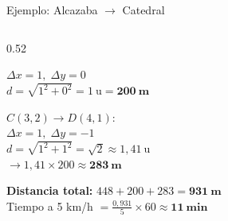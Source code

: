 \documentclass[aspectratio=169, 10pt, spanish]{beamer}
\begin{document}
\begin{frame}{Ejemplo: Alcazaba $\rightarrow$ Catedral}
\begin{columns}[c]
\begin{column}{0.52\textwidth}
\begin{pasobox}[2]
        $\Delta x=1,\;\Delta y=0$\\
        $d=\sqrt{1^2+0^2}=1\ \text{u} = \mathbf{200\ \text{m}}$
      \end{pasobox}
      \vspace{4pt}
      \begin{pasobox}[3]
        \AlmFontFootnote
        $C(3,2)\to D(4,1)$:\\
        $\Delta x=1,\;\Delta y=-1$\\
        $d=\sqrt{1^2+1^2}=\sqrt{2}\approx 1{,}41\ \text{u}$\\
        $\rightarrow 1{,}41\times 200\approx \mathbf{283\ \text{m}}$
      \end{pasobox}
      \vspace{4pt}
      \begin{pasobox}[4]
        \AlmFontFootnote
        \textbf{Distancia total:}
        $448+200+283 = \mathbf{931\ \text{m}}$\\[2pt]
        Tiempo a 5 km/h $= \frac{0{,}931}{5}\times 60
        \approx \mathbf{11\ \text{min}}$
      \end{pasobox}
    \end{column}
  \end{columns}
\end{frame}

\end{document}
